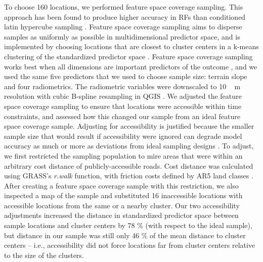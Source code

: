 \documentclass[soil, manuscript]{copernicus}
\begin{document}
To choose 160 locations, we performed feature space coverage sampling.
This approach has been found to produce higher accuracy in RFs than conditioned latin hypercube sampling \citep{wadouxSamplingDesignOptimization2019, maComparisonConditionedLatin2020}.
Feature space coverage sampling aims to disperse samples as uniformly as possible in multidimensional predictor space, and is implemented by choosing locations that are closest to cluster centers in a k-means clustering of the standardized predictor space \citep{brusSamplingDigitalSoil2019}.
Feature space coverage sampling works best when all dimensions are important predictors of the outcome \citep{wadouxSamplingDesignOptimization2019}, and we used the same five predictors that we used to choose sample size: terrain slope and four radiometrics.
The radiometric variables were downscaled to \unit{10\,m} resolution with cubic B-spline resampling in QGIS \citep[v.3,][]{QGISsoftware}.
We adjusted the feature space coverage sampling to ensure that locations were accessible within time constraints, and assessed how this changed our sample from an ideal feature space coverage sample.
Adjusting for accessibility is justified because the smaller sample size that would result if accessibility were ignored can degrade model accuracy as much or more as deviations from ideal sampling designs \citep{wadouxSamplingDesignOptimization2019, maComparisonConditionedLatin2020}.
To adjust, we first restricted the sampling population to mire areas that were within an arbitrary cost distance of publicly-accessible roads.
Cost distance was calculated using GRASS's \emph{r.walk} function, with friction costs defined by AR5 land classes \citep{GRASSv8-2}.
After creating a feature space coverage sample with this restriction, we also inspected a map of the sample and substituted 16 inaccessible locations with accessible locations from the same or a nearby cluster.
Our two accessibility adjustments increased the distance in standardized predictor space between sample locations and cluster centers by 78 \% (with respect to the ideal sample), but distance in our sample was still only 46 \% of the mean distance to cluster centers -- i.e., accessibility did not force locations far from cluster centers relative to the size of the clusters.
\end{document}
